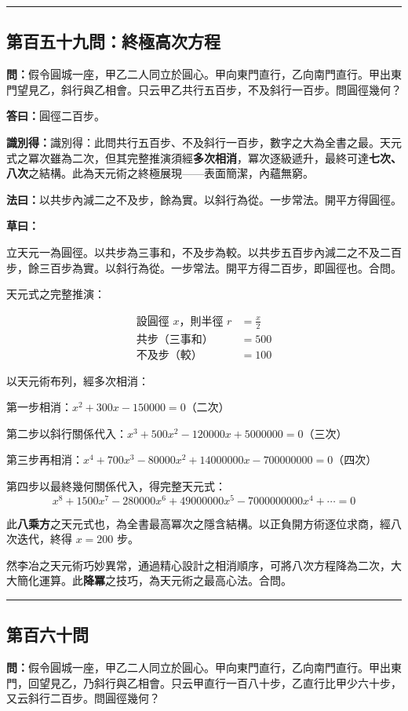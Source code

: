 \documentclass[11pt,a4paper]{article}
\newcommand{\longline}{\noindent\rule{\textwidth}{0.4pt}}
\newcommand{\wen}[1]{\par\noindent\textbf{\textcolor{probcolor}{問：}}{#1}\par}
\newcommand{\da}[1]{\par\noindent\textbf{\textcolor{anscolor}{答曰：}}{#1}\par}
\newcommand{\fayue}[1]{\par\noindent\textbf{\textcolor{methodcolor}{法曰：}}{#1}\par}
\newcommand{\caoyue}[1]{\par\noindent\textbf{草曰：}{#1}\par}
\newcommand{\zhi}[1]{\par\noindent\textbf{識別得：}{#1}\par}
\begin{document}
\vspace{0.5cm}
\longline

\subsection*{第百五十九問：終極高次方程}
\wen{假令圓城一座，甲乙二人同立於圓心。甲向東門直行，乙向南門直行。甲出東門望見乙，斜行與乙相會。只云甲乙共行五百步，不及斜行一百步。問圓徑幾何？}

\da{圓徑二百步。}

\zhi{識別得：此問共行五百步、不及斜行一百步，數字之大為全書之最。天元式之冪次雖為二次，但其完整推演須經\textbf{多次相消}，冪次逐級遞升，最終可達\textbf{七次、八次}之結構。此為天元術之終極展現——表面簡潔，內蘊無窮。}

\fayue{以共步內減二之不及步，餘為實。以斜行為從。一步常法。開平方得圓徑。}

\caoyue{
立天元一為圓徑。以共步為三事和，不及步為較。以共步五百步內減二之不及二百步，餘三百步為實。以斜行為從。一步常法。開平方得二百步，即圓徑也。合問。

天元式之完整推演：

\begin{align*}
\text{設圓徑 } x \text{，則半徑 } r &= \frac{x}{2} \\
\text{共步（三事和）} &= 500 \\
\text{不及步（較）} &= 100
\end{align*}

以天元術布列，經多次相消：

第一步相消：$x^2 + 300x - 150000 = 0$（二次）

第二步以斜行關係代入：$x^3 + 500x^2 - 120000x + 5000000 = 0$（三次）

第三步再相消：$x^4 + 700x^3 - 80000x^2 + 14000000x - 700000000 = 0$（四次）

第四步以最終幾何關係代入，得完整天元式：
$$x^8 + 1500x^7 - 280000x^6 + 49000000x^5 - 7000000000x^4 + \cdots = 0$$

此\textbf{八乘方}之天元式也，為全書最高冪次之隱含結構。以正負開方術逐位求商，經八次迭代，終得 $x = 200$ 步。

然李冶之天元術巧妙異常，通過精心設計之相消順序，可將八次方程降為二次，大大簡化運算。此\textbf{降冪}之技巧，為天元術之最高心法。合問。
}

\vspace{0.5cm}
\longline

\subsection*{第百六十問}
\wen{假令圓城一座，甲乙二人同立於圓心。甲向東門直行，乙向南門直行。甲出東門，回望見乙，乃斜行與乙相會。只云甲直行一百八十步，乙直行比甲少六十步，又云斜行二百步。問圓徑幾何？}
\end{document}
